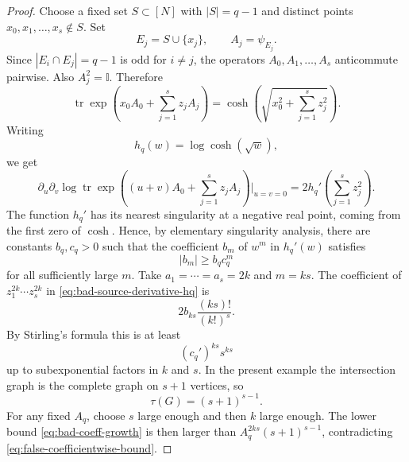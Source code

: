 \documentclass[11pt]{article}
\newcommand{\tr}{\operatorname{tr}}
\newcommand{\I}{\mathbb{I}}
\begin{document}
\begin{proof}
  Choose a fixed set $S\subset[N]$ with $|S|=q-1$ and distinct points
  $x_0,x_1,\ldots,x_s\notin S$.  Set
  \begin{equation}\label{eq:bad-family-Ej}
    E_j=S\cup\{x_j\},
    \qquad
    A_j=\psi_{E_j}.
  \end{equation}
  Since $|E_i\cap E_j|=q-1$ is odd for $i\neq j$, the operators
  $A_0,A_1,\ldots,A_s$ anticommute pairwise.  Also $A_j^2=\I$.
  Therefore
  \begin{equation}\label{eq:anticommuting-cosh}
    \tr\exp\left(x_0A_0+\sum_{j=1}^s z_jA_j\right)
    =
    \cosh\left(
      \sqrt{x_0^2+\sum_{j=1}^s z_j^2}
    \right).
  \end{equation}
  Writing
  \begin{equation}\label{eq:hq-def}
    h_q(w)=\log\cosh\left(\sqrt w\right),
  \end{equation}
  we get
  \begin{equation}\label{eq:bad-source-derivative-hq}
    \partial_u\partial_v
    \log\tr\exp\left(
      (u+v)A_0+\sum_{j=1}^s z_jA_j
    \right)\bigg|_{u=v=0}
    =
    2h_q'\left(\sum_{j=1}^s z_j^2\right).
  \end{equation}
  The function $h_q'$ has its nearest singularity at a negative real point,
  coming from the first zero of $\cosh$.  Hence, by elementary singularity
  analysis, there are constants $b_q,c_q>0$ such that the coefficient $b_m$ of
  $w^m$ in $h_q'(w)$ satisfies
  \begin{equation}\label{eq:hq-coeff-lower}
    |b_m|\geq b_q c_q^m
  \end{equation}
  for all sufficiently large $m$.
  Take $a_1=\cdots=a_s=2k$ and $m=ks$.  The coefficient of
  $z_1^{2k}\cdots z_s^{2k}$ in \eqref{eq:bad-source-derivative-hq} is
  \begin{equation}\label{eq:multinomial-bad-coeff}
    2b_{ks}\frac{(ks)!}{(k!)^s}.
  \end{equation}
  By Stirling's formula this is at least
  \begin{equation}\label{eq:bad-coeff-growth}
    (c_q')^{ks}s^{ks}
  \end{equation}
  up to subexponential factors in $k$ and $s$.  In the present example the
  intersection graph is the complete graph on $s+1$ vertices, so
  \begin{equation}\label{eq:complete-tree-count}
    \tau(G)=(s+1)^{s-1}.
  \end{equation}
  For any fixed $A_q$, choose $s$ large enough and then $k$ large enough.  The
  lower bound \eqref{eq:bad-coeff-growth} is then larger than
  $A_q^{2ks}(s+1)^{s-1}$, contradicting
  \eqref{eq:false-coefficientwise-bound}.
\end{proof}
\end{document}
